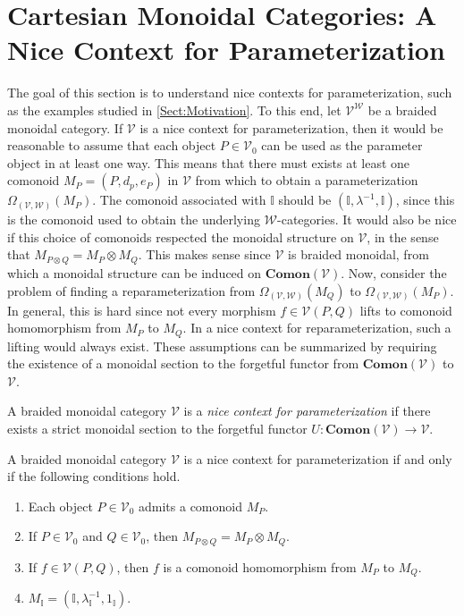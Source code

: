 \section{Cartesian Monoidal Categories: A Nice Context for Parameterization}
\label{Sect:CartMon}
%
The goal of this section is to understand nice contexts for parameterization, such as the examples studied in \cref{Sect:Motivation}.
To this end, let $\mathcal{V}^{\mathcal{W}}$ be a braided monoidal category.
If $\mathcal{V}$ is a nice context for parameterization, then it would be reasonable to assume that each object $P \in \mathcal{V}_0$ can be used as the parameter object in at least one way.
This means that there must exists at least one comonoid $M_P = ( P, d_p, e_P )$ in $\mathcal{V}$ from which to obtain a parameterization $\Omega_{(\mathcal{V},\mathcal{W})}( M_P )$.
The comonoid associated with $\mathbb{I}$ should be $( \mathbb{I}, \lambda^{-1}, \mathbb{I} )$, since this is the comonoid used to obtain the underlying $\mathcal{W}$-categories.
It would also be nice if this choice of comonoids respected the monoidal structure on $\mathcal{V}$, in the sense that $M_{P \otimes Q} = M_P \otimes M_Q$.
This makes sense since $\mathcal{V}$ is braided monoidal, from which a monoidal structure can be induced on $\mathbf{Comon}( \mathcal{V} )$.
Now, consider the problem of finding a reparameterization from $\Omega_{(\mathcal{V},\mathcal{W})}( M_Q )$ to $\Omega_{(\mathcal{V},\mathcal{W})}( M_P )$.
In general, this is hard since not every morphism $f \in \mathcal{V}( P, Q )$ lifts to comonoid homomorphism from $M_P$ to $M_Q$.
In a nice context for reparameterization, such a lifting would always exist.
These assumptions can be summarized by requiring the existence of a monoidal section to the forgetful functor from $\mathbf{Comon}( \mathcal{V} )$ to $\mathcal{V}$.

\begin{defi}
    A braided monoidal category $\mathcal{V}$ is a \emph{nice context for parameterization} if there exists a strict monoidal section to the forgetful functor $U : \mathbf{Comon}( \mathcal{V} ) \to \mathcal{V}$.
\end{defi}

\begin{lem}
    \label{Lem:NiceParam}
    A braided monoidal category $\mathcal{V}$ is a nice context for parameterization if and only if the following conditions hold.
    \begin{enumerate}
    \item Each object $P \in \mathcal{V}_0$ admits a comonoid $M_P$.
    \item If $P \in \mathcal{V}_0$ and $Q \in \mathcal{V}_0$, then $M_{P \otimes Q} = M_P \otimes M_Q$.
    \item If $f \in \mathcal{V}( P, Q )$, then $f$ is a comonoid homomorphism from $M_P$ to $M_Q$.
    \item $M_{\mathbb{I}} = ( \mathbb{I}, \lambda^{-1}_{\mathbb{I}}, 1_{\mathbb{I}} )$.
    \end{enumerate}
\end{lem}


